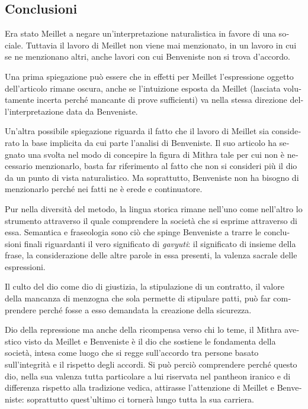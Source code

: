 \documentclass[french,output=paper,colorlinks,citecolor=brown]{../langscibook}
\begin{document}
\begin{otherlanguage}{italian}
\section{Conclusioni}

Era stato Meillet a negare un’interpretazione naturalistica in favore di una sociale. Tuttavia il lavoro di Meillet non viene mai menzionato, in un lavoro in cui se ne menzionano altri, anche lavori con cui Benveniste non si trova d’accordo.

Una prima spiegazione può essere che in effetti per Meillet l’espressione oggetto dell’articolo rimane oscura, anche se l’intuizione esposta da Meillet (lasciata volutamente incerta perché mancante di prove sufficienti) va nella stessa direzione dell’interpretazione data da Benveniste.

Un’altra possibile spiegazione riguarda il fatto che il lavoro di Meillet sia considerato la base implicita da cui parte l’analisi di Benveniste. Il suo articolo ha segnato una svolta nel modo di concepire la figura di Mithra tale per cui non è necessario menzionarlo, basta far riferimento al fatto che non si consideri più il dio da un punto di vista naturalistico. Ma soprattutto, Benveniste non ha bisogno di menzionarlo perché nei fatti ne è erede e continuatore.

Pur nella diversità del metodo, la lingua storica rimane nell’uno come nell’altro lo strumento attraverso il quale comprendere la società che si esprime attraverso di essa. Semantica e fraseologia sono ciò che spinge Benveniste a trarre le conclusioni finali riguardanti il vero significato di \textit{gavyuti}: il significato di insieme della frase, la considerazione delle altre parole in essa presenti, la valenza sacrale delle espressioni.

Il culto del dio come dio di giustizia, la stipulazione di un contratto, il valore della mancanza di menzogna che sola permette di stipulare patti, può far comprendere perché fosse a esso demandata la creazione della sicurezza.

Dio della repressione ma anche della ricompensa verso chi lo teme, il Mithra avestico visto da Meillet e Benveniste è il dio che sostiene le fondamenta della società, intesa come luogo che si regge sull’accordo tra persone basato sull’integrità e il rispetto degli accordi. Si può perciò comprendere perché questo dio, nella sua valenza tutta particolare a lui riservata nel pantheon iranico e di differenza rispetto alla tradizione vedica, attirasse l’attenzione di Meillet e Benveniste: soprattutto quest’ultimo ci tornerà lungo tutta la sua carriera.


\end{otherlanguage}
\end{document}
